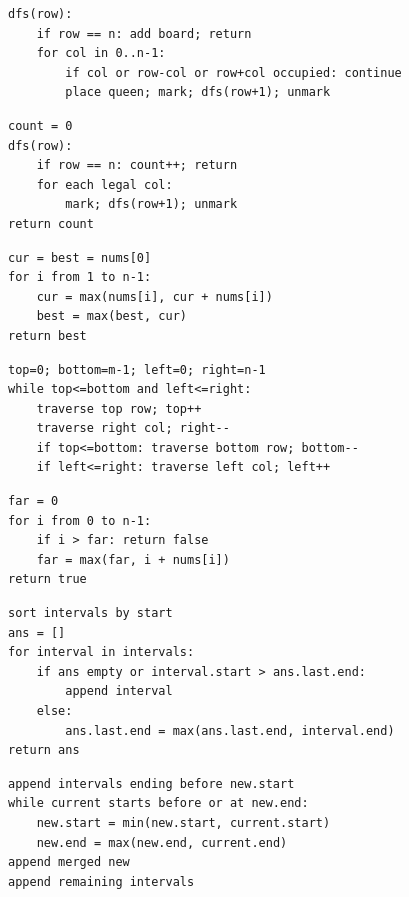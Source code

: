 \documentclass[11pt,a4paper]{ctexart}
\begin{document}
\begin{verbatim}
dfs(row):
    if row == n: add board; return
    for col in 0..n-1:
        if col or row-col or row+col occupied: continue
        place queen; mark; dfs(row+1); unmark
\end{verbatim}

\begin{verbatim}
count = 0
dfs(row):
    if row == n: count++; return
    for each legal col:
        mark; dfs(row+1); unmark
return count
\end{verbatim}

\begin{verbatim}
cur = best = nums[0]
for i from 1 to n-1:
    cur = max(nums[i], cur + nums[i])
    best = max(best, cur)
return best
\end{verbatim}

\begin{verbatim}
top=0; bottom=m-1; left=0; right=n-1
while top<=bottom and left<=right:
    traverse top row; top++
    traverse right col; right--
    if top<=bottom: traverse bottom row; bottom--
    if left<=right: traverse left col; left++
\end{verbatim}

\begin{verbatim}
far = 0
for i from 0 to n-1:
    if i > far: return false
    far = max(far, i + nums[i])
return true
\end{verbatim}

\begin{verbatim}
sort intervals by start
ans = []
for interval in intervals:
    if ans empty or interval.start > ans.last.end:
        append interval
    else:
        ans.last.end = max(ans.last.end, interval.end)
return ans
\end{verbatim}

\begin{verbatim}
append intervals ending before new.start
while current starts before or at new.end:
    new.start = min(new.start, current.start)
    new.end = max(new.end, current.end)
append merged new
append remaining intervals
\end{verbatim}
\end{document}
